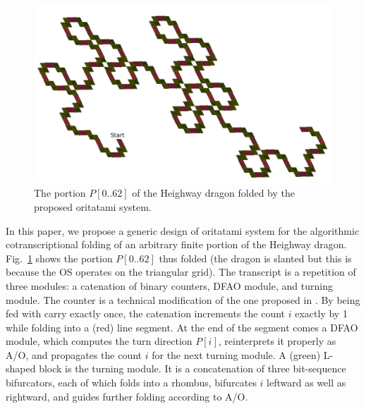 \begin{figure}
\vspace*{-5mm}
\centering
\includegraphics[width=\linewidth]{pic/6bit_heighway.pdf}
\caption{The portion $P[0 .. 62]$ of the Heighway dragon folded by the proposed oritatami system.}
\label{fig:heighway6_oritatami}
\vspace*{-5mm}
\end{figure}

In this paper, we propose a generic design of oritatami system for the algorithmic cotranscriptional folding of an arbitrary finite portion of the Heighway dragon. 
Fig.~\ref{fig:heighway6_oritatami} shows the portion $P[0 .. 62]$ thus folded (the dragon is slanted but this is because the OS operates on the triangular grid). 
The transcript is a repetition of three modules: a catenation of binary counters, DFAO module, and turning module. 
The counter is a technical modification of the one proposed in \cite{GeMeScSe2016}. 
By being fed with carry exactly once, the catenation increments the count $i$ exactly by 1 while folding into a (red) line segment. 
At the end of the segment comes a DFAO module, which computes the turn direction $P[i]$, reinterprets it properly as A/O, and propagates the count $i$ for the next turning module. 
A (green) L-shaped block is the turning module. 
It is a concatenation of three bit-sequence bifurcators, each of which folds into a rhombus, bifurcates $i$ leftward as well as rightward, and guides further folding according to A/O. 

